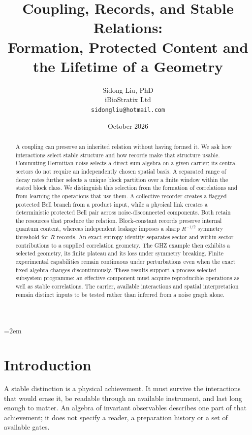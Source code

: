 \documentclass[12pt,a4paper]{article}
\title{Coupling, Records, and Stable Relations:\\
Formation, Protected Content and the Lifetime of a Geometry}
\author{
  Sidong Liu, PhD \\[0.6ex]
  iBioStratix Ltd \\[0.8ex]
  \texttt{sidongliu@hotmail.com}
}
\date{October 2026}
\begin{document}
\emergencystretch=2em
\raggedbottom
{}

\maketitle

\begin{abstract}
A coupling can preserve an inherited relation without having formed it. We ask how interactions select stable structure and how records make that structure usable. Commuting Hermitian noise selects a direct-sum algebra on a given carrier; its central sectors do not require an independently chosen spatial basis. A separated range of decay rates further selects a unique block partition over a finite window within the stated block class. We distinguish this selection from the formation of correlations and from learning the operations that use them. A collective recorder creates a flagged protected Bell branch from a product input, while a physical link creates a deterministic protected Bell pair across noise-disconnected components. Both retain the resources that produce the relation. Block-constant records preserve internal quantum content, whereas independent leakage imposes a sharp $R^{-1/2}$ symmetry threshold for $R$ records. An exact entropy identity separates sector and within-sector contributions to a supplied correlation geometry. The GHZ example then exhibits a selected geometry, its finite plateau and its loss under symmetry breaking. Finite experimental capabilities remain continuous under perturbations even when the exact fixed algebra changes discontinuously. These results support a process-selected subsystem programme: an effective component must acquire reproducible operations as well as stable correlations. The carrier, available interactions and spatial interpretation remain distinct inputs to be tested rather than inferred from a noise graph alone.
\end{abstract}

\section{Introduction}
\label{sec:intro}

A stable distinction is a physical achievement. It must survive the interactions that would erase it, be readable through an available instrument, and last long enough to matter. An algebra of invariant observables describes one part of that achievement; it does not specify a reader, a preparation history or a set of available gates.
\end{document}
